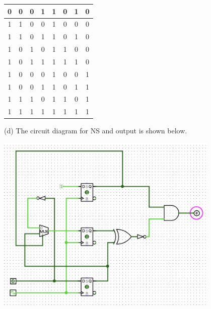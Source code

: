 \documentclass[a4paper]{article}
\begin{document}
\begin{answer}[Question 3]
\begin{center}
\begin{tabular}{ |c|c|c|c||c|c|c|c| }
            \hline
            0 & 0 & 0 & 1 & 1 & 0 & 1 & 0 \\ 
            \hline
            1 & 1 & 0 & 0 & 1 & 0 & 0 & 0 \\ 
            \hline
            1 & 1 & 0 & 1 & 1 & 0 & 1 & 0 \\ 
            \hline
            1 & 0 & 1 & 0 & 1 & 1 & 0 & 0 \\ 
            \hline
            1 & 0 & 1 & 1 & 1 & 1 & 1 & 0 \\ 
            \hline
            1 & 0 & 0 & 0 & 1 & 0 & 0 & 1 \\ 
            \hline
            1 & 0 & 0 & 1 & 1 & 0 & 1 & 1 \\ 
            \hline
            1 & 1 & 1 & 0 & 1 & 1 & 0 & 1 \\ 
            \hline
            1 & 1 & 1 & 1 & 1 & 1 & 1 & 1 \\ 
            \hline
        \end{tabular}
    \end{center}
    (d) The circuit diagram for NS and output is shown below.\\
    \begin{center}
        \includegraphics[width=0.8\textwidth]{FSM_circuit.png}
    \end{center}
        
\end{answer}
\end{document}
